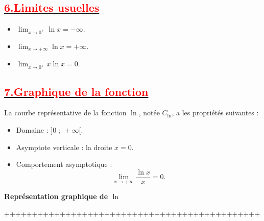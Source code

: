 \documentclass[12pt]{article}
\begin{document}
\subsection*{\underline{\textbf{\textcolor{red}{6.Limites usuelles}}}}
\begin{itemize}
    \item $\lim_{x \to 0^+} \ln x = -\infty$.
    \item $\lim_{x \to +\infty} \ln x = +\infty$.
    \item $\lim_{x \to 0^+} x \ln x = 0$.
\end{itemize}

\subsection*{\underline{\textbf{\textcolor{red}{7.Graphique de la fonction}}}}
La courbe représentative de la fonction $\ln$, notée $C_{\ln}$, a les propriétés suivantes :
\begin{itemize}
    \item Domaine : $]0\;;\ +\infty[$.
    \item Asymptote verticale : la droite $x = 0$.
    \item Comportement asymptotique :
    \[
    \lim_{x \to +\infty} \frac{\ln x}{x} = 0.
    \]
\end{itemize}

\begin{center}
    \textbf{Représentation graphique de $\ln$}
\end{center}


++++++++++++++++++++++++++++++++++++++++++++++
\end{document}
